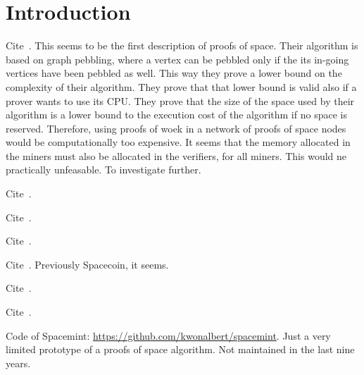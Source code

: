 \section{Introduction}\label{sec:introduction}

Cite~\cite{DziembowskiFKP15}. This seems to be the first description of proofs of space.
Their algorithm is based on graph pebbling, where a vertex can be pebbled only if the
its in-going vertices have been pebbled as well. This way they prove a lower bound on the
complexity of their algorithm. They prove that that lower bound is valid also if a prover
wants to use its CPU. They prove that the size of the space used by their algorithm
is a lower bound to the execution cost of the algorithm if no space is reserved.
Therefore, using proofs of woek in a network of proofs of space nodes would
be computationally too expensive. It seems that the memory allocated in the miners
must also be allocated in the verifiers, for all miners. This would ne practically unfeasable.
To investigate further.

Cite~\cite{AtenieseBFG14}.

Cite~\cite{TangZDWLG0L19}.

Cite~\cite{RenD16}.

Cite~\cite{ParkKFGAP18}. Previously Spacecoin, it seems.

Cite~\cite{Reyzin23}.

Cite~\cite{DworkN92}.

Code of Spacemint: \url{https://github.com/kwonalbert/spacemint}. Just a very limited prototype of a
proofs of space algorithm. Not maintained in the last nine years.
